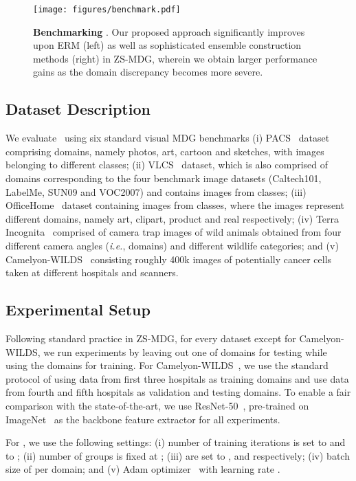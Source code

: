 \begin{figure*}[t]
	\centering
	\texttt{[image: figures/benchmark.pdf]}
	\caption{\textbf{Benchmarking \muld}. Our proposed approach significantly improves upon ERM (left) as well as sophisticated ensemble construction methods (right) in ZS-MDG, wherein we obtain larger performance gains as the domain discrepancy becomes more severe.}
	\label{fig:benchmark}
\end{figure*} 
\subsection{Dataset Description}
We evaluate \muld~using six standard visual MDG benchmarks (i) PACS~\citep{PACS} dataset comprising  domains, namely photos, art, cartoon and sketches, with images belonging to  different classes; (ii) VLCS~\citep{VLCS} dataset, which is also comprised of  domains corresponding to the four benchmark image datasets (Caltech101, LabelMe, SUN09 and VOC2007) and contains images from  classes; (iii) OfficeHome~\citep{officehome} dataset containing images from  classes, where the images represent  different domains, namely art, clipart, product and real respectively; (iv) Terra Incognita~\citep{terra} comprised of camera trap images of wild animals obtained from four different camera angles (\textit{i.e.}, domains) and  different wildlife categories; and (v) Camelyon-WILDS~\citep{bandi2018detection, koh2021wilds} consisting roughly 400k images of potentially cancer cells taken at different hospitals and scanners.  
\subsection{Experimental Setup}
Following standard practice in ZS-MDG, for every dataset except for Camelyon-WILDS, we run experiments by leaving out one of  domains for testing while using the  domains for training.
For Camelyon-WILDS~\citep{bandi2018detection, koh2021wilds}, we use the standard protocol of using data from first three hospitals as training domains and use data from fourth and fifth hospitals as validation and testing domains. To enable a fair comparison with the state-of-the-art, we use ResNet-50~\citep{he2016deep}, pre-trained on ImageNet~\citep{ILSVRC15} as the backbone feature extractor for all experiments.

For \regmethod, we use the following settings: (i) number of training iterations  is set to  and  to ; (ii) number of groups is fixed at ; (iii)  are set to ,  and  respectively; (iv) batch size of  per domain; and (v) Adam optimizer~\citep{ADAM} with learning rate .


